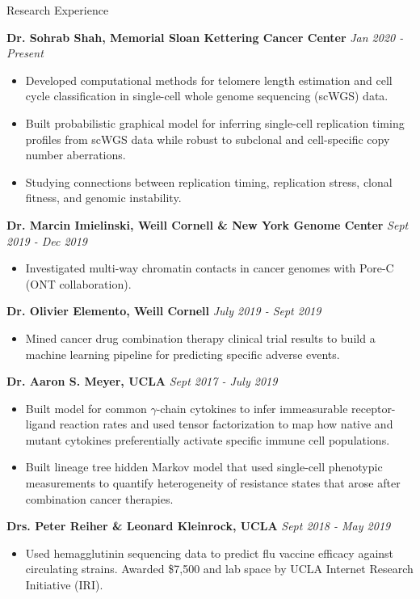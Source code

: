 \documentclass{resume} %
\begin{document}
\begin{rSection}{Research Experience}

{\bf Dr. Sohrab Shah, Memorial Sloan Kettering Cancer Center} \hfill {\em Jan 2020 - Present}
\begin{itemize}
  \item Developed computational methods for telomere length estimation and cell cycle classification in single-cell whole genome sequencing (scWGS) data.
  \item Built probabilistic graphical model for inferring single-cell replication timing profiles from scWGS data while robust to subclonal and cell-specific copy number aberrations.
  \item Studying connections between replication timing, replication stress, clonal fitness, and genomic instability.
\end{itemize}

{\bf Dr. Marcin Imielinski, Weill Cornell \& New York Genome Center} \hfill {\em Sept 2019 - Dec 2019}
\begin{itemize}
  \item Investigated multi-way chromatin contacts in cancer genomes with Pore-C (ONT collaboration).
\end{itemize}

{\bf Dr. Olivier Elemento, Weill Cornell} \hfill {\em July 2019 - Sept 2019}
\begin{itemize}
  \item Mined cancer drug combination therapy clinical trial results to build a machine learning pipeline for predicting specific adverse events.
\end{itemize}

{\bf Dr. Aaron S. Meyer, UCLA} \hfill {\em Sept 2017 - July 2019}
\begin{itemize}
  \item Built model for common $\gamma$-chain cytokines to infer immeasurable receptor-ligand reaction rates and used tensor factorization to map how native and mutant cytokines preferentially activate specific immune cell populations.
  \item Built lineage tree hidden Markov model that used single-cell phenotypic measurements to quantify heterogeneity of resistance states that arose after combination cancer therapies.
\end{itemize}

{\bf Drs. Peter Reiher \& Leonard Kleinrock, UCLA} \hfill {\em Sept 2018 - May 2019}
\begin{itemize}
    \item Used hemagglutinin sequencing data to predict flu vaccine efficacy against circulating strains. Awarded \$7,500 and lab space by UCLA Internet Research Initiative (IRI).
\end{itemize}



\end{rSection}
\end{document}
